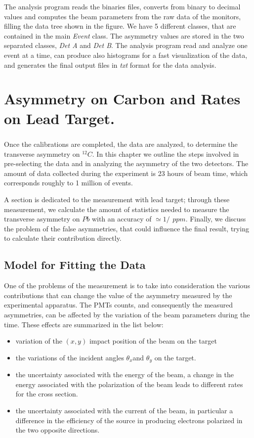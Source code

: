 The analysis program reads the binaries files, converts from binary to decimal values and computes the beam parameters from the raw data of the monitors, filling the data tree shown in the figure. We have 5 different classes, that are contained in the main \textit{Event} class. The asymmetry values are stored in the two separated classes, \textit{Det A} and \textit{Det B}. The analysis program read and analyze one event at a time, can produce also histograms for a fast visualization of the data, and generates the final output files in \textit{txt} format for the data analysis.  

\chapter{Asymmetry on Carbon and Rates on Lead Target.}

\paragraph{}
Once the calibrations are completed, the data are analyzed, to determine the transverse asymmetry on $^{12}C$. In this chapter we outline the steps involved in pre-selecting the data and in analyzing the asymmetry of the two detectors. The amount of data collected during the experiment is 23 hours of beam time, which corresponds roughly to 1 million of events.

A section is dedicated to the measurement with lead target; through these measurement, we calculate the amount of statistics needed to measure the transverse asymmetry on $Pb$ with an accuracy of $ \simeq 1/\ \, ppm$. Finally, we discuss the problem of the false asymmetries, that could influence the final result, trying to calculate their contribution directly. 

\section{Model for Fitting the Data} \label{Model}

One of the problems of the measurement is to take into consideration the various contributions that can change the value of the asymmetry measured by the experimental apparatus. The PMTs counts, and consequently the measured asymmetries, can be affected by the variation of the beam parameters during the time. These effects are summarized in the list below:
\begin{itemize}
\item variation of the $(x,y)$ impact position of the beam on the target
\item the variations of the incident angles $\theta_{x}$and $\theta_{y}$ on the target.
\item the uncertainty associated with the energy of the beam, a change in the energy associated with the polarization of the beam leads to different rates for the cross section.
\item the uncertainty associated with the current of the beam, in particular a difference in the 
efficiency of the source in producing electrons polarized in the two opposite directions.
\end{itemize}

